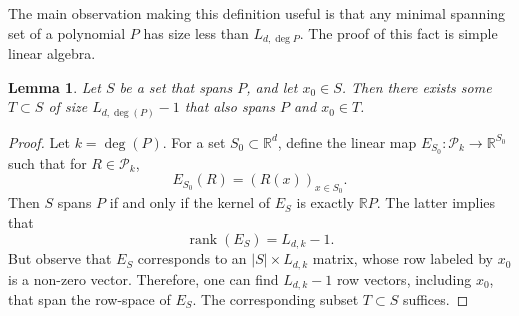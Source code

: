 \documentclass[11pt]{article}
\theoremstyle{plain}
\newtheorem{lemma}[theorem]{Lemma}
\theoremstyle{definition}
\DeclareMathOperator{\rank}{rank}
\begin{document}
    The main observation making this definition useful is that any minimal spanning set of a polynomial $P$ has size less than $L_{d,\deg{P}}$. The proof of this fact is simple linear algebra.
	
	\begin{lemma}\label{lemma:spanning}
		Let $S$ be a set that spans $P$, and let $x_0\in S$. Then there exists some $T\subset S$ of size $L_{d,\deg(P)}-1$ that also spans $P$ and $x_0\in T$.
	\end{lemma}
	
	\begin{proof}
		Let $k=\deg(P)$. For a set $S_0\subset \mathbb{R}^d$, define the linear map $E_{S_0}:\mathcal{P}_k\rightarrow \mathbb{R}^{S_0}$ such that for $R\in \mathcal{P}_k$, $$E_{S_0}(R)=(R(x))_{x\in S_0}.$$
		Then $S$ spans $P$ if and only if the kernel of $E_S$ is exactly $\mathbb{R}P$. The latter implies that $$\rank(E_S)=L_{d,k}-1.$$
        But observe that $E_S$ corresponds to an $|S|\times L_{d,k}$ matrix, whose row labeled by $x_0$ is a non-zero vector. Therefore, one can find $L_{d,k}-1$ row vectors, including $x_0$, that span the row-space of $E_S$.  The corresponding subset $T\subset S$ suffices. 
	\end{proof}
	
\end{document}
